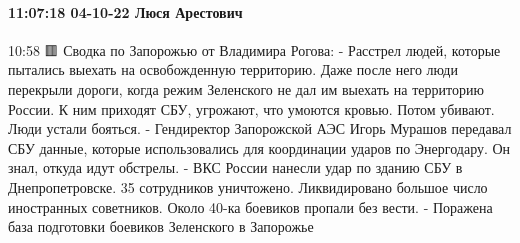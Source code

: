  
 
 
 
 

\paragraph{11:07:18 04-10-22 Люся Арестович}
10:58
🟥 Сводка по Запорожью от Владимира Рогова:
- Расстрел людей, которые пытались выехать на освобожденную территорию. Даже после него люди перекрыли дороги, когда режим Зеленского не дал им выехать на территорию России. К ним приходят СБУ, угрожают, что умоются кровью. Потом убивают. Люди устали бояться.
- Гендиректор Запорожской АЭС Игорь Мурашов передавал СБУ данные, которые использовались для координации ударов по Энергодару. Он знал, откуда идут обстрелы.
- ВКС России нанесли удар по зданию СБУ в Днепропетровске. 35 сотрудников уничтожено. Ликвидировано большое число иностранных советников. Около 40-ка боевиков пропали без вести.
- Поражена база подготовки боевиков Зеленского в Запорожье
